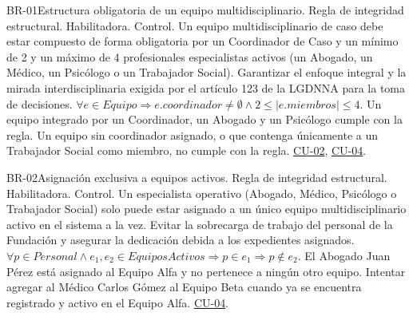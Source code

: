 \begin{BussinesRule}{BR-01}{Estructura obligatoria de un equipo multidisciplinario.}
	\BRitem[Tipo:] Regla de integridad estructural. 
	\BRitem[Clase:] Habilitadora. 
	\BRitem[Nivel:] Control.
	\BRitem[Descripción:] Un equipo multidisciplinario de caso debe estar compuesto de forma obligatoria por un Coordinador de Caso y un mínimo de 2 y un máximo de 4 profesionales especialistas activos (un Abogado, un Médico, un Psicólogo o un Trabajador Social).
	\BRitem[Motivación:] Garantizar el enfoque integral y la mirada interdisciplinaria exigida por el artículo 123 de la LGDNNA para la toma de decisiones.
	\BRitem[Sentencia:] $\forall e \in Equipo \Rightarrow e.coordinador \neq \emptyset \land 2 \le |e.miembros| \le 4$.
	 Un equipo integrado por un Coordinador, un Abogado y un Psicólogo cumple con la regla.
	 Un equipo sin coordinador asignado, o que contenga únicamente a un Trabajador Social como miembro, no cumple con la regla.
	 \hyperlink{CU-02}{CU-02}, \hyperlink{CU-04}{CU-04}.
\end{BussinesRule}

\begin{BussinesRule}{BR-02}{Asignación exclusiva a equipos activos.}
	\BRitem[Tipo:] Regla de integridad estructural. 
	\BRitem[Clase:] Habilitadora. 
	\BRitem[Nivel:] Control.
	\BRitem[Descripción:] Un especialista operativo (Abogado, Médico, Psicólogo o Trabajador Social) solo puede estar asignado a un único equipo multidisciplinario activo en el sistema a la vez.
	\BRitem[Motivación:] Evitar la sobrecarga de trabajo del personal de la Fundación y asegurar la dedicación debida a los expedientes asignados.
	\BRitem[Sentencia:] $\forall p \in Personal \land e_1, e_2 \in EquiposActivos \Rightarrow p \in e_1 \Rightarrow p \notin e_2$.
	 El Abogado Juan Pérez está asignado al Equipo Alfa y no pertenece a ningún otro equipo.
	 Intentar agregar al Médico Carlos Gómez al Equipo Beta cuando ya se encuentra registrado y activo en el Equipo Alfa.
	 \hyperlink{CU-04}{CU-04}.
\end{BussinesRule}

